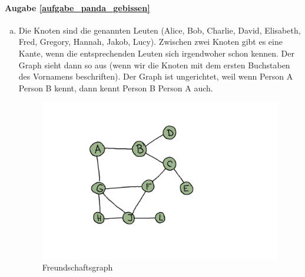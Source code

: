 \paragraph{Augabe \ref{aufgabe_panda_gebissen}}
\begin{enumerate}[(a)]
\item Die Knoten sind die genannten Leuten (Alice, Bob, Charlie, David, Elisabeth, Fred, Gregory, Hannah, Jakob, Lucy). Zwischen zwei Knoten gibt es eine Kante, wenn die entsprechenden Leuten sich irgendwoher schon kennen. Der Graph sieht dann so aus (wenn wir die Knoten mit dem ersten Buchstaben des Vornamens beschriften). Der Graph ist ungerichtet, weil wenn Person A Person B kennt, dann kennt Person B Person A auch.
    \begin{figure}[H]
        \centering
        \includegraphics[width=\textwidth]{Pictures/SP/panda_gebissen_graph.png}
        \caption{Freundschaftsgraph}
        \label{fig:Gregory}
    \end{figure}


\end{enumerate}
